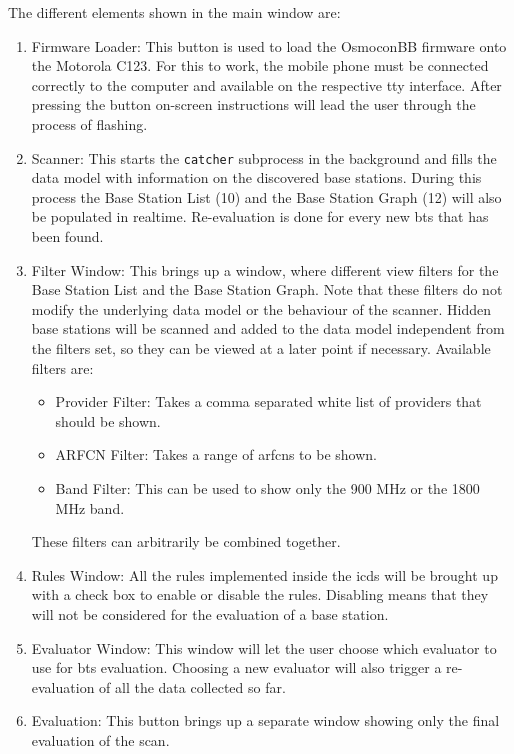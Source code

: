 The different elements shown in the main window are:
\begin{enumerate}
\item Firmware Loader: This button is used to load the OsmoconBB firmware onto the Motorola C123. 
For this to work, the mobile phone must be connected correctly to the computer and available on the respective tty interface.
After pressing the button on-screen instructions will lead the user through the process of flashing.

\item Scanner: This starts the \texttt{catcher} subprocess in the background and fills the data model with information on the discovered base stations.
During this process the Base Station List (10) and the Base Station Graph (12) will also be populated in realtime.
Re-evaluation is done for every new \gls{bts} that has been found.

\item Filter Window: This brings up a window, where different view filters for the Base Station List and the Base Station Graph.
Note that these filters do not modify the underlying data model or the behaviour of the scanner.
Hidden base stations will be scanned and added to the data model independent from the filters set, so they can be viewed at a later point if necessary.
Available filters are:
	\begin{itemize}
	\item Provider Filter: Takes a comma separated white list of providers that should be shown.
	\item ARFCN Filter: Takes a range of \glspl{arfcn} to be shown.
	\item Band Filter: This can be used to show only the 900 MHz or the 1800 MHz band.
	\end{itemize}
These filters can arbitrarily be combined together.

\item Rules Window: All the rules implemented inside the \gls{icds} will be brought up with a check box to enable or disable the rules.
Disabling means that they will not be considered for the evaluation of a base station.

\item Evaluator Window: This window will let the user choose  which evaluator to use for \gls{bts} evaluation.
Choosing a new evaluator will also trigger a re-evaluation of all the data collected so far.

\item Evaluation: This button brings up a separate window showing only the final evaluation of the scan.


\end{enumerate}

